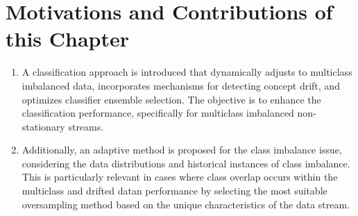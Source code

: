   \section{Motivations and Contributions of this Chapter} \label{sec:4_2_motivation}
  \begin{enumerate}[nosep]
    \item A classification approach is introduced that dynamically adjusts to multiclass imbalanced data, incorporates mechanisms for
    detecting concept drift, and optimizes classifier ensemble selection. The objective is to enhance the classification performance, specifically for multiclass imbalanced non-stationary streams.
   \item Additionally, an adaptive method is proposed for the class imbalance issue, considering the data distributions and historical instances of class imbalance. This is particularly relevant in cases where class overlap occurs within the multiclass and drifted datan performance by selecting the most suitable oversampling method based on the unique characteristics of the data stream. 
    \end{enumerate}